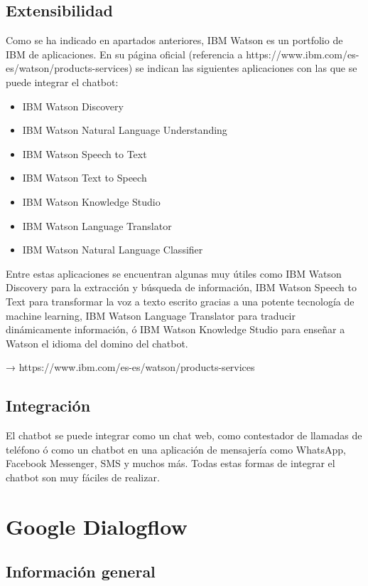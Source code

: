\subsection*{Extensibilidad}

Como se ha indicado en apartados anteriores, IBM Watson es un portfolio de IBM de aplicaciones. En su página oficial (referencia a https://www.ibm.com/es-es/watson/products-services) se indican las siguientes aplicaciones con las que se puede integrar el chatbot:

\begin{itemize}
    \item IBM Watson Discovery
    \item IBM Watson Natural Language Understanding
    \item IBM Watson Speech to Text
    \item IBM Watson Text to Speech
    \item IBM Watson Knowledge Studio
    \item IBM Watson Language Translator
    \item IBM Watson Natural Language Classifier
\end{itemize}

Entre estas aplicaciones se encuentran algunas muy útiles como IBM Watson Discovery para la extracción y búsqueda de información, IBM Watson Speech to Text para transformar la voz a texto escrito gracias a una potente tecnología de machine learning, IBM Watson Language Translator para traducir dinámicamente información, ó IBM Watson Knowledge Studio para enseñar a Watson el idioma del domino del chatbot.



→ https://www.ibm.com/es-es/watson/products-services

\subsection*{Integración}

El chatbot se puede integrar como un chat web, como contestador de llamadas de teléfono ó como un chatbot en una aplicación de mensajería como WhatsApp, Facebook Messenger, SMS y muchos más. Todas estas formas de integrar el chatbot son muy fáciles de realizar.


\section{Google Dialogflow}

\subsection*{Información general}


